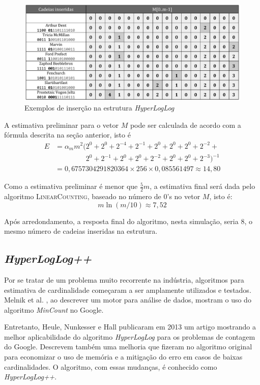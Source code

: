 \begin{figure}[!htbp]
  \centering
  \includegraphics[scale=0.6]{figures/hll_example.pdf}
  \caption{Exemplos de inserção na estrutura \emph{HyperLogLog}}
  \label{fig:hll_example}
\end{figure}

A estimativa preliminar para o vetor $M$ pode ser calculada de acordo com a fórmula descrita na seção anterior, isto é
\begin{align*}
    E &= \alpha_m m^2 (2^0 + 2^0 + 2^{-4} + 2^{-1} + 2^0 + 2^0 + 2^0 + 2^{-2} + \\
            &\phantom{= \alpha_m m^2 (} 2^0 + 2^{-1} + 2^0 + 2^0 + 2^{-2} + 2^0 + 2^0 + 2^{-3})^{-1} \\
    & = 0,6757304291820364 \times 256 \times 0,085561497 \approx 14,80
\end{align*}

Como a estimativa preliminar é menor que $\frac{5}{2}m$, a estimativa final será dada pelo algoritmo \textsc{LinearCounting}, baseado no número de 0's no vetor $M$, isto é:
\[
    m\ln(m/10) \approx 7,52
\]
    
Após arredondamento, a resposta final do algoritmo, nesta simulação, seria $8$, o mesmo número de cadeias inseridas na estrutura.

\subsection{\emph{HyperLogLog++}}

Por se tratar de um problema muito recorrente na indústria, algoritmos para estimativa de cardinalidade começaram a ser amplamente utilizados e testados. Melnik et al. \cite{melnik2010dremel}, ao descrever um motor para análise de dados, mostram o uso do algoritmo \emph{MinCount} no Google.

Entretanto, Heule, Nunkesser e Hall publicaram em 2013 \cite{heule2013hyperloglog} um artigo mostrando a melhor aplicabilidade do algoritmo \emph{HyperLogLog} para os problemas de contagem do Google. Descrevem também uma melhoria que fizeram no algoritmo original para economizar o uso de memória e a mitigação do erro em casos de baixas cardinalidades. O algoritmo, com essas mudanças, é conhecido como \emph{HyperLogLog++}.

